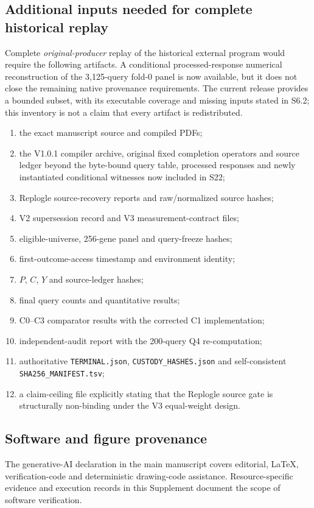 \documentclass[11pt]{article}
\begin{document}
\subsection{Additional inputs needed for complete historical replay}
Complete \emph{original-producer} replay of the historical external program would require the following artifacts. A conditional processed-response numerical reconstruction of the 3,125-query fold-0 panel is now available, but it does not close the remaining native provenance requirements. The current release provides a bounded subset, with its executable coverage and missing inputs stated in S6.2; this inventory is not a claim that every artifact is redistributed.
\begin{enumerate}
\item the exact manuscript source and compiled PDFs;
\item the V1.0.1 compiler archive, original fixed completion operators and source ledger beyond the byte-bound query table, processed responses and newly instantiated conditional witnesses now included in S22;
\item Replogle source-recovery reports and raw/normalized source hashes;
\item V2 supersession record and V3 measurement-contract files;
\item eligible-universe, 256-gene panel and query-freeze hashes;
\item first-outcome-access timestamp and environment identity;
\item $P$, $C$, $Y$ and source-ledger hashes;
\item final query counts and quantitative results;
\item C0--C3 comparator results with the corrected C1 implementation;
\item independent-audit report with the 200-query Q4 re-computation;
\item authoritative \texttt{TERMINAL.json}, \texttt{CUSTODY\_HASHES.json} and self-consistent \texttt{SHA256\_MANIFEST.tsv};
\item a claim-ceiling file explicitly stating that the Replogle source gate is structurally non-binding under the V3 equal-weight design.
\end{enumerate}


\subsection{Software and figure provenance}
The generative-AI declaration in the main manuscript covers editorial, LaTeX, verification-code and deterministic drawing-code assistance. Resource-specific evidence and execution records in this Supplement document the scope of software verification.
\end{document}

